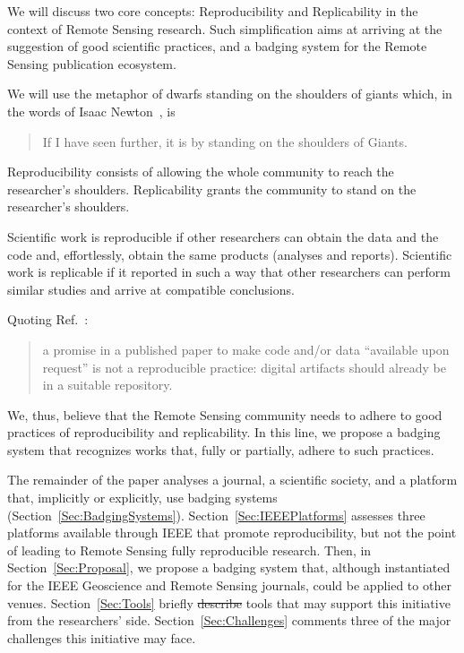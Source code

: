 \documentclass[journal,twoside]{IEEEtran}
\providecommand{\DIFadd}[1]{{\protect\color{blue}\uwave{#1}}} %
\providecommand{\DIFdel}[1]{{\protect\color{red}\sout{#1}}}                      %
\providecommand{\DIFaddbegin}{} %
\providecommand{\DIFaddend}{} %
\providecommand{\DIFdelbegin}{} %
\providecommand{\DIFdelend}{} %
\newcommand{\DIFscaledelfig}{0.5}
\newlength{\DIFdelgraphicswidth} %
\newlength{\DIFdelgraphicsheight} %
\newcommand{\DIFaddincludegraphics}[2][]{{\color{blue}\fbox{\DIFOincludegraphics[#1]{#2}}}} %
\newcommand{\DIFdelincludegraphics}[2][]{%
\sbox{\DIFdelgraphicsbox}{\DIFOincludegraphics[#1]{#2}}%
\settoboxwidth{\DIFdelgraphicswidth}{\DIFdelgraphicsbox} %
\settoboxtotalheight{\DIFdelgraphicsheight}{\DIFdelgraphicsbox} %
\scalebox{\DIFscaledelfig}{%
\parbox[b]{\DIFdelgraphicswidth}{\usebox{\DIFdelgraphicsbox}\\[-\baselineskip] \rule{\DIFdelgraphicswidth}{0em}}\llap{\resizebox{\DIFdelgraphicswidth}{\DIFdelgraphicsheight}{%
\setlength{\unitlength}{\DIFdelgraphicswidth}%
\begin{picture}(1,1)%
\thicklines\linethickness{2pt} %
{\color[rgb]{1,0,0}\put(0,0){\framebox(1,1){}}}%
{\color[rgb]{1,0,0}\put(0,0){\line( 1,1){1}}}%
{\color[rgb]{1,0,0}\put(0,1){\line(1,-1){1}}}%
\end{picture}%
}\hspace*{3pt}}} %
} %
\DeclareRobustCommand{\DIFaddbegin}{\DIFOaddbegin \let\includegraphics\DIFaddincludegraphics} %
\DeclareRobustCommand{\DIFaddend}{\DIFOaddend \let\includegraphics\DIFOincludegraphics} %
\DeclareRobustCommand{\DIFdelbegin}{\DIFOdelbegin \let\includegraphics\DIFdelincludegraphics} %
\DeclareRobustCommand{\DIFdelend}{\DIFOaddend \let\includegraphics\DIFOincludegraphics} %
\begin{document}
We will discuss two core concepts: Reproducibility and Replicability in the context of Remote Sensing research.
Such simplification aims at arriving at the suggestion of good scientific practices, and a badging system for the Remote Sensing publication ecosystem.

We will use the metaphor of dwarfs standing on the shoulders of giants which, in the words of Isaac Newton~\cite{LetterNewton}, is
\begin{quote}
	If I have seen further, it is by standing on the shoulders of Giants.
\end{quote}
Reproducibility consists of allowing the whole community to reach the researcher's shoulders.
Replicability grants the community to stand on the researcher's shoulders.

Scientific work is reproducible if other researchers can obtain the data and the code and, effortlessly, obtain the same products (analyses and reports).
Scientific work is replicable if it reported in such a way that other researchers can perform similar studies and arrive at compatible conclusions.

Quoting Ref.~\cite{PraxisofReproducibleComputationalScience}:
\begin{quote}
	a promise in a published paper
	to make code and/or data ``available upon
	request'' is not a reproducible practice: digital
	artifacts should already be in a suitable repository.
\end{quote}

We, thus, believe that the Remote Sensing community needs to adhere to good practices of reproducibility and replicability.
In this line, we propose a badging system that recognizes works that, fully or partially, adhere to such practices.

The remainder of the paper analyses a journal, a scientific society, and a platform that, implicitly or explicitly, use badging systems (Section~\ref{Sec:BadgingSystems}).
Section~\ref{Sec:IEEEPlatforms} assesses three platforms available through IEEE that promote reproducibility, but not the point of leading to Remote Sensing fully reproducible research.
Then, in Section~\ref{Sec:Proposal}, we propose a badging system that, although instantiated for the IEEE Geoscience and Remote Sensing journals, could be applied to other venues.
Section~\ref{Sec:Tools} briefly \DIFdelbegin \DIFdel{describe }\DIFdelend \DIFaddbegin \DIFadd{describes }\DIFaddend tools that may support this initiative from the researchers' side.
Section~\ref{Sec:Challenges} comments three of the major challenges this initiative may face.
\end{document}
